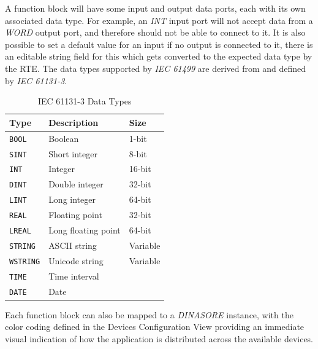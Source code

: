 A function block will have some input and output data ports, each with its own associated data type. For example, an \textit{INT} input port will not accept data from a \textit{WORD} output port, and therefore should not be able to connect to it. It is also possible to set a default value for an input if no output is connected to it, there is an editable string field for this which gets converted to the expected data type by the \ac{RTE}. The data types supported by \textit{IEC 61499} are derived from and defined by \textit{IEC 61131-3}.

\begin{table}[H]
    \centering
    \begin{tabular}{lll}
        \hline
        \textbf{Type} & \textbf{Description} & \textbf{Size} \\
        \hline
        \texttt{BOOL}    & Boolean              & 1-bit  \\
        \texttt{SINT}    & Short integer        & 8-bit  \\
        \texttt{INT}     & Integer              & 16-bit \\
        \texttt{DINT}    & Double integer       & 32-bit \\
        \texttt{LINT}    & Long integer         & 64-bit \\
        \texttt{REAL}    & Floating point       & 32-bit \\
        \texttt{LREAL}   & Long floating point  & 64-bit \\
        \texttt{STRING}  & ASCII string         & Variable \\
        \texttt{WSTRING} & Unicode string       & Variable \\
        \texttt{TIME}    & Time interval        &        \\
        \texttt{DATE}    & Date                 &        \\
        \hline
    \end{tabular}
    \caption{IEC 61131-3 Data Types \cite{noauthor_iec_2026}}
    \label{tab:iec-data-types}
\end{table}


Each function block can also be mapped to a \textit{DINASORE} instance, with the color coding defined in the Devices Configuration View providing an immediate visual indication of how the application is distributed across the available devices. %

